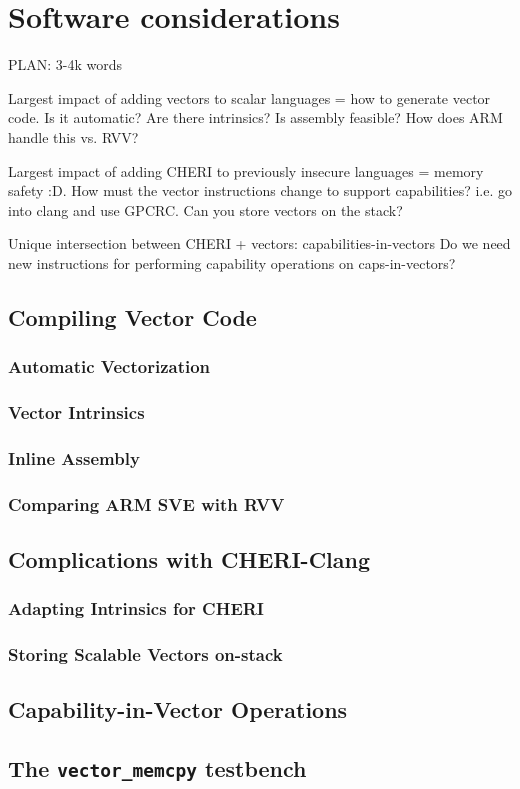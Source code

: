 \chapter{Software considerations}
PLAN: 3-4k words

Largest impact of adding vectors to scalar languages = how to generate vector code.
Is it automatic?
Are there intrinsics?
Is assembly feasible?
How does ARM handle this vs. RVV?

Largest impact of adding CHERI to previously insecure languages = memory safety :D.
How must the vector instructions change to support capabilities? i.e. go into clang and use GPCRC.
Can you store vectors on the stack?

Unique intersection between CHERI + vectors: capabilities-in-vectors
Do we need new instructions for performing capability operations on caps-in-vectors?

\section{Compiling Vector Code}
\subsection{Automatic Vectorization}
\subsection{Vector Intrinsics}
\subsection{Inline Assembly}
\subsection{Comparing ARM SVE with RVV} 

\section{Complications with CHERI-Clang}
\subsection{Adapting Intrinsics for CHERI}
\subsection{Storing Scalable Vectors on-stack}

\section{Capability-in-Vector Operations}

\section{The \texttt{vector\_memcpy} testbench}